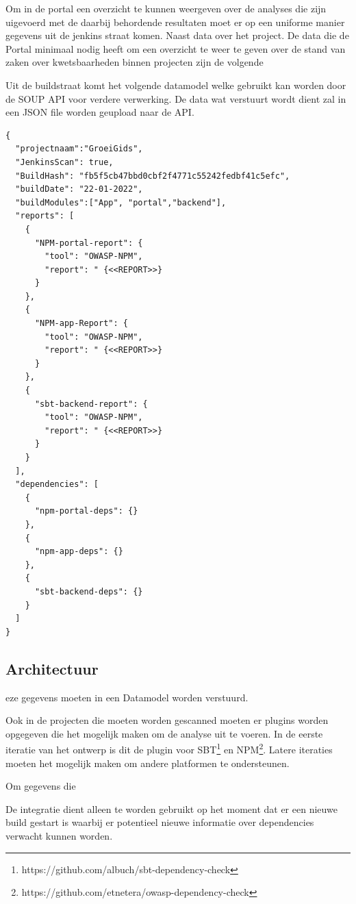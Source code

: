 Om in de portal een overzicht te kunnen weergeven over de analyses die zijn uigevoerd met de daarbij behordende resultaten moet er op een uniforme manier gegevens uit de jenkins straat komen. Naast data over het project.
De data die de Portal minimaal nodig heeft om een overzicht te weer te geven over de stand van zaken over kwetsbaarheden binnen projecten zijn de volgende


Uit de buildstraat komt het volgende datamodel welke gebruikt kan worden door de SOUP API voor verdere verwerking. De data wat verstuurt wordt dient zal in een JSON file worden geupload naar de API.

\begin{lstlisting}[caption={Datamodel vanuit Jenkins},label=lst:DatamodelJenkins]
{
  "projectnaam":"GroeiGids",
  "JenkinsScan": true,
  "BuildHash": "fb5f5cb47bbd0cbf2f4771c55242fedbf41c5efc",
  "buildDate": "22-01-2022",
  "buildModules":["App", "portal","backend"],
  "reports": [
    {
      "NPM-portal-report": {
        "tool": "OWASP-NPM",
        "report": " {<<REPORT>>}
      }
    },
    {
      "NPM-app-Report": {
        "tool": "OWASP-NPM",
        "report": " {<<REPORT>>}
      }
    },
    {
      "sbt-backend-report": {
        "tool": "OWASP-NPM",
        "report": " {<<REPORT>>}
      }
    }
  ],
  "dependencies": [
    {
      "npm-portal-deps": {}
    },
    {
      "npm-app-deps": {}
    },
    {
      "sbt-backend-deps": {}
    }
  ]
}
\end{lstlisting}

\subsection{Architectuur}


eze gegevens moeten in een Datamodel worden verstuurd.

Ook in de projecten die moeten worden gescanned moeten er plugins worden opgegeven die het mogelijk maken om de analyse uit te voeren. In de eerste iteratie van het ontwerp is dit de plugin voor SBT\footnote{https://github.com/albuch/sbt-dependency-check} en NPM\footnote{https://github.com/etnetera/owasp-dependency-check}. Latere iteraties moeten het mogelijk maken om andere platformen te ondersteunen.

Om gegevens die


De integratie dient alleen te worden gebruikt op het moment dat er een nieuwe build gestart is waarbij er potentieel nieuwe informatie over dependencies verwacht kunnen worden.


